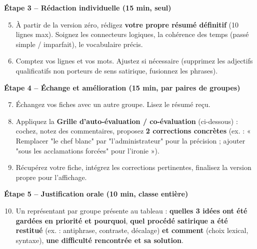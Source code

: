 \documentclass[11pt]{article}
\newcommand{\cle}[1]{{\popxbold\color{popdark}#1}}
\begin{document}
\textbf{Étape 3 -- Rédaction individuelle (15 min, seul)}
\begin{enumerate}
    \setcounter{enumi}{4}
    \item À partir de la version zéro, rédigez \textbf{votre propre résumé définitif} (10 lignes max). Soignez les \cle{connecteurs logiques}, la \cle{cohérence des temps} (passé simple / imparfait), le \cle{vocabulaire précis}.
    \item Comptez vos lignes et vos mots. Ajustez si nécessaire (supprimez les adjectifs qualificatifs non porteurs de sens satirique, fusionnez les phrases).
\end{enumerate}

\textbf{Étape 4 -- Échange et amélioration (15 min, par paires de groupes)}
\begin{enumerate}
    \setcounter{enumi}{6}
    \item Échangez vos fiches avec un autre groupe. Lisez le résumé reçu.
    \item Appliquez la \textbf{Grille d'auto-évaluation / co-évaluation} (ci-dessous) : cochez, notez des commentaires, proposez \textbf{2 corrections concrètes} (ex. : « Remplacer "le chef blanc" par "l'administrateur" pour la précision ; ajouter "sous les acclamations forcées" pour l'ironie »).
    \item Récupérez votre fiche, intégrez les corrections pertinentes, finalisez la version propre pour l'affichage.
\end{enumerate}

\textbf{Étape 5 -- Justification orale (10 min, classe entière)}
\begin{enumerate}
    \setcounter{enumi}{9}
    \item Un représentant par groupe présente au tableau : \textbf{quelles 3 idées ont été gardées en priorité et pourquoi}, \textbf{quel procédé satirique a été restitué} (ex. : antiphrase, contraste, décalage) \textbf{et comment} (choix lexical, syntaxe), \textbf{une difficulté rencontrée et sa solution}.
\end{enumerate}
\end{document}
